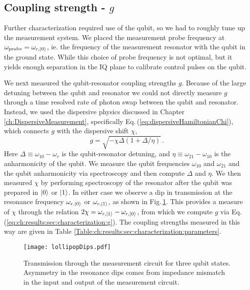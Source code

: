 \subsection{Coupling strength - $g$}

Further characterization required use of the qubit, so we had to roughly tune up the measurement system.
We placed the measurement probe frequency at $\omega_{\text{probe}}=\omega_{r,|0\rangle}$, ie. the frequency of the measurement resonator with the qubit in the ground state.
While this choice of probe frequency is not optimal, but it yields enough separation in the IQ plane to calibrate control pulses on the qubit.

We next measured the qubit-resonator coupling strengths $g$.
Because of the large detuning between the qubit and resonator we could not directly measure $g$ through a time resolved rate of photon swap between the qubit and resonator.
Instead, we used the dispersive physics discussed in Chapter\,\ref{ch:DispersiveMeasurement}, specifically Eq.\,(\ref{eq:dispersiveHamiltonianChi}), which connects $g$ with the dispersive shift $\chi$, \begin{equation}
g = \sqrt{- \chi \Delta (1 + \Delta/\eta)} \, . \label{eq:ch:results:sec:characterization:g} \end{equation}
Here $\Delta \equiv \omega_{10} - \omega_r$ is the qubit-resonator detuning, and $\eta \equiv \omega_{21} - \omega_{10}$ is the anharmonicity of the qubit.
We measure the qubit frequencies $\omega_{10}$ and $\omega_{21}$ and the qubit anharmonicity via spectroscopy and then compute $\Delta$ and $\eta$.
We then measured $\chi$ by performing spectroscopy of the resonator after the qubit was prepared in $|0\rangle$ or $|1\rangle$.
In either case we observe a dip in transmission at the resonance frequency $\omega_{r,|0\rangle}$ or $\omega_{r,|1\rangle}$, as shown in Fig.\,\ref{Fig:ch:results:sec:characterization:lollipopDips}.
This provides a measure of $\chi$ through the relation $2\chi = \omega_{r,|1\rangle} - \omega_{r,|0\rangle}$, from which we compute $g$ via Eq.\,(\ref{eq:ch:results:sec:characterization:g}).
The coupling strengths measured in this way are given in Table \ref{Table:ch:results:sec:characterization:parameters}.

\begin{figure}
\begin{centering}
\texttt{[image: lollipopDips.pdf]}
\par\end{centering}
\caption{Transmission through the measurement circuit for three qubit states. Asymmetry in the resonance dips comes from impedance mismatch in the input and output of the measurement circuit.}
\label{Fig:ch:results:sec:characterization:lollipopDips}
\end{figure}

